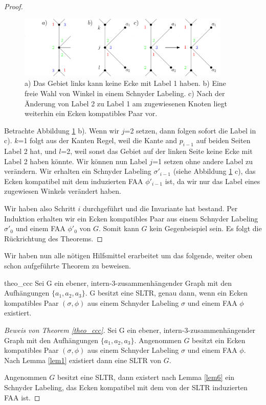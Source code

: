 \begin{proof}
\begin{figure}[h]
	\centering
	  \includegraphics[width=0.9\textwidth]{lem6_5.png}
    	\caption{a) Das Gebiet links kann keine Ecke mit Label 1 haben. b) Eine freie Wahl von Winkel in einem Schnyder Labeling. c) Nach der Änderung von Label 2 zu Label 1 am zugewiesenen Knoten liegt weiterhin ein Ecken kompatibles Paar vor.}
    	\label{pic_lem6_5}
\end{figure}

Betrachte Abbildung \ref{pic_lem6_5} b). Wenn wir $j$=2 setzen, dann folgen sofort die Label in c). $k$=1 folgt aus der Kanten Regel, weil die Kante and $p_{i-1}$ auf beiden Seiten Label 2 hat, und $l$=2, weil sonst das Gebiet auf der linken Seite keine Ecke mit Label 2 haben könnte. Wir können nun Label $j$=1 setzen ohne andere Label zu verändern. Wir erhalten ein Schnyder Labeling $\sigma'_{i-1}$ (siehe Abbildung \ref{pic_lem6_5} c), das Ecken kompatibel mit dem induzierten FAA $\phi'_{i-1}$ ist, da wir nur das Label eines zugewiesen Winkels verändert haben.

Wir haben also Schritt $i$ durchgeführt und die Invariante hat bestand. Per Induktion erhalten wir ein Ecken kompatibles Paar aus einem Schnyder Labeling $\sigma'_0$ und einem FAA $\phi'_0$ von $G$. Somit kann $G$ kein Gegenbeispiel sein. Es folgt die Rückrichtung des Theorems.
\end{proof}

Wir haben nun alle nötigen Hilfsmittel erarbeitet um das folgende, weiter oben schon aufgeführte Theorem zu beweisen.

\begin{reptheorem}{theo_ccc}
Sei G ein ebener, intern-3-zusammenhängender Graph mit den Aufhängungen $\{a_1,a_2,a_3\}$. G besitzt eine SLTR, genau dann, wenn ein Ecken kompatibles Paar $(\sigma,\phi)$ aus einem Schnyder Labeling $\sigma$ und einem FAA $\phi$ existiert.
\end{reptheorem}

\begin{proof}[Beweis von Theorem \ref{theo_ccc}]
Sei G ein ebener, intern-3-zusammenhängender Graph mit den Aufhängungen $\{a_1,a_2,a_3\}$. Angenommen $G$ besitzt ein Ecken kompatibles Paar $(\sigma,\phi)$ aus einem Schnyder Labeling $\sigma$ und einem FAA $\phi$. Nach Lemma \ref{lem1} existiert dann eine SLTR von $G$. 

Angenommen $G$ besitzt eine SLTR, dann existert nach Lemma \ref{lem6} ein Schnyder Labeling, das Ecken kompatibel mit dem von der SLTR induzierten FAA ist.
\end{proof}

